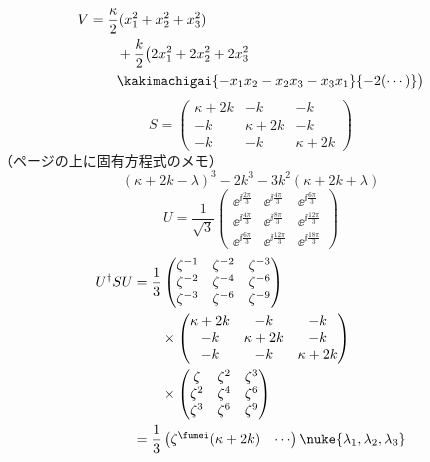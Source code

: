 \begin{align*}
  V&=\frac{\kappa}{2}(x_1^{2}+x_2^{2}+x_3^{2})\\
  &\qquad+\frac{k}{2}\bigl(2x_1^{2}+2x_2^{2}+2x_3^{2}\\
  &\qquad\kakimachigai{-x_1x_2-x_2x_3-x_3x_1}{-2(\cdots)}\bigr)
\end{align*}
\[
  S=\begin{pmatrix}\kappa+2k&-k&-k\\-k&\kappa+2k&-k\\-k&-k&\kappa+2k\end{pmatrix}
\]
（ページの上に固有方程式のメモ）
\[ (\kappa+2k-\lambda)^{3}-2k^{3}-3k^{2}(\kappa+2k+\lambda) \]
\[
  U=\frac{1}{\sqrt{3}}\begin{pmatrix}\ee^{\ii\frac{2\pi}{3}}&\ee^{\ii\frac{4\pi}{3}}&\ee^{\ii\frac{6\pi}{3}}\\[2pt]\ee^{\ii\frac{4\pi}{3}}&\ee^{\ii\frac{8\pi}{3}}&\ee^{\ii\frac{12\pi}{3}}\\[2pt]\ee^{\ii\frac{6\pi}{3}}&\ee^{\ii\frac{12\pi}{3}}&\ee^{\ii\frac{18\pi}{3}}\end{pmatrix}
\]
\begin{align*}
  U^{\dagger}SU&=\frac{1}{3}\begin{pmatrix}\zeta^{-1}&\zeta^{-2}&\zeta^{-3}\\\zeta^{-2}&\zeta^{-4}&\zeta^{-6}\\\zeta^{-3}&\zeta^{-6}&\zeta^{-9}\end{pmatrix}\\
  &\qquad\times\begin{pmatrix}\kappa+2k&-k&-k\\-k&\kappa+2k&-k\\-k&-k&\kappa+2k\end{pmatrix}\\
  &\qquad\times\begin{pmatrix}\zeta&\zeta^{2}&\zeta^{3}\\\zeta^{2}&\zeta^{4}&\zeta^{6}\\\zeta^{3}&\zeta^{6}&\zeta^{9}\end{pmatrix}\\
  &=\frac{1}{3}\begin{pmatrix}\zeta^{\fumei}(\kappa+2k)&\cdots\end{pmatrix}\nuke{\lambda_1,\lambda_2,\lambda_3}
\end{align*}
